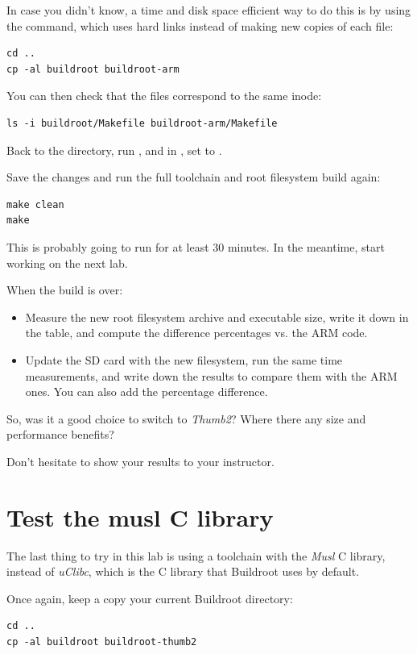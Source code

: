 In case you didn't know, a time and disk space efficient way to do this is by using the
 command, which uses hard links instead of making new copies
of each file:

\begin{verbatim}
cd ..
cp -al buildroot buildroot-arm
\end{verbatim}

You can then check that the files correspond to the same inode:
\begin{verbatim}
ls -i buildroot/Makefile buildroot-arm/Makefile
\end{verbatim}

Back to the  directory, run , and
in , set  to
.

Save the changes and run the full toolchain and root filesystem build
again:

\begin{verbatim}
make clean
make
\end{verbatim}

This is probably going to run for at least 30 minutes. In the meantime,
start working on the next lab.

When the build is over:
\begin{itemize}
\item Measure the new root filesystem archive and 
executable size, write it down in the table, and compute the difference
percentages vs. the ARM code.
\item Update the SD card with the new filesystem, run the same time
measurements, and write down the results to compare them with the ARM
ones. You can also add the percentage difference.
\end{itemize}

So, was it a good choice to switch to {\em Thumb2}? Where there any size
and performance benefits?

Don't hesitate to show your results to your instructor.

\section{Test the musl C library}

The last thing to try in this lab is using a toolchain with the {\em
Musl} C library, instead of {\em uClibc}, which is the C library that
Buildroot uses by default.

Once again, keep a copy your current Buildroot directory:
\begin{verbatim}
cd ..
cp -al buildroot buildroot-thumb2
\end{verbatim}

